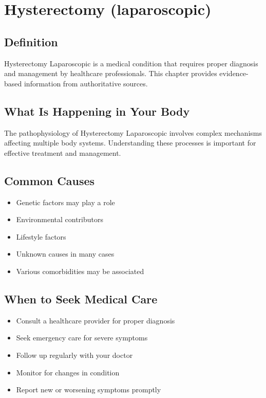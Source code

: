 
\chapter{Hysterectomy (laparoscopic)}

\section*{Definition}
Hysterectomy Laparoscopic is a medical condition that requires proper diagnosis and management by healthcare professionals. This chapter provides evidence-based information from authoritative sources.

\section*{What Is Happening in Your Body}
The pathophysiology of Hysterectomy Laparoscopic involves complex mechanisms affecting multiple body systems. Understanding these processes is important for effective treatment and management.

\section*{Common Causes}
\begin{itemize}
  \item Genetic factors may play a role
  \item Environmental contributors
  \item Lifestyle factors
  \item Unknown causes in many cases
  \item Various comorbidities may be associated
\end{itemize}

\section*{When to Seek Medical Care}
\begin{itemize}
  \item Consult a healthcare provider for proper diagnosis
  \item Seek emergency care for severe symptoms
  \item Follow up regularly with your doctor
  \item Monitor for changes in condition
  \item Report new or worsening symptoms promptly
\end{itemize}

